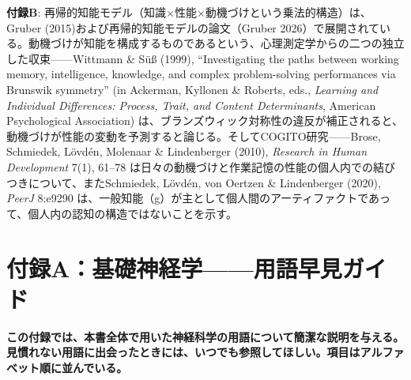 \documentclass[11pt, twoside, openright]{book}
\begin{document}
\textbf{付録B}: 再帰的知能モデル（知識×性能×動機づけという乗法的構造）は、Gruber (2015)および再帰的知能モデルの論文（Gruber 2026）で展開されている。動機づけが知能を構成するものであるという、心理測定学からの二つの独立した収束------Wittmann \& Süß (1999), ``Investigating the paths between working memory, intelligence, knowledge, and complex problem-solving performances via Brunswik symmetry'' (in Ackerman, Kyllonen \& Roberts, eds., \textit{Learning and Individual Differences: Process, Trait, and Content Determinants}, American Psychological Association) は、ブランズウィック対称性の違反が補正されると、動機づけが性能の変動を予測すると論じる。そしてCOGITO研究------Brose, Schmiedek, Lövdén, Molenaar \& Lindenberger (2010), \textit{Research in Human Development} 7(1), 61--78 は日々の動機づけと作業記憶の性能の個人内での結びつきについて、またSchmiedek, Lövdén, von Oertzen \& Lindenberger (2020), \textit{PeerJ} 8:e9290 は、一般知能（g）が主として個人間のアーティファクトであって、個人内の認知の構造ではないことを示す。


\chapter*{付録A：基礎神経学------用語早見ガイド}

\textbf{この付録では、本書全体で用いた神経科学の用語について簡潔な説明を与える。見慣れない用語に出会ったときには、いつでも参照してほしい。項目はアルファベット順に並んでいる。}
\end{document}
